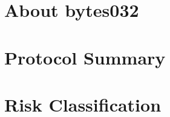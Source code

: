 \hypertarget{about-bytes}{%
\section{About bytes032}\label{about-bytes}}



\hypertarget{protocol-summary}{%
\section{Protocol Summary}\label{protocol-summary}}




\hypertarget{risk-classification}{%
\section{Risk Classification}\label{risk-classification}}


